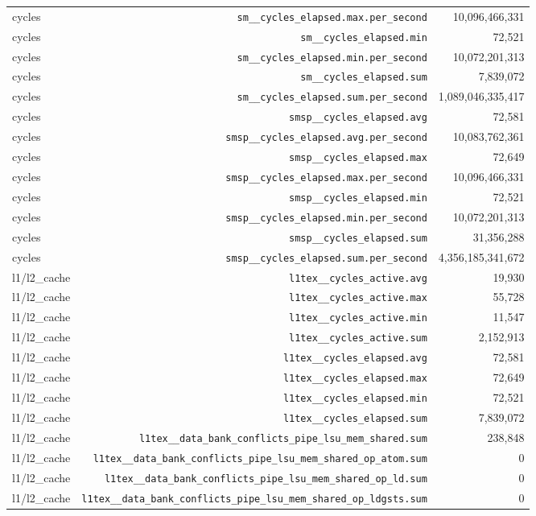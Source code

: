 \begin{table}[h]
\begin{tabular}{|l|r|r|}
cycles & \texttt{sm__cycles_elapsed.max.per_second} & 10,096,466,331 \\
cycles & \texttt{sm__cycles_elapsed.min} & 72,521 \\
cycles & \texttt{sm__cycles_elapsed.min.per_second} & 10,072,201,313 \\
cycles & \texttt{sm__cycles_elapsed.sum} & 7,839,072 \\
cycles & \texttt{sm__cycles_elapsed.sum.per_second} & 1,089,046,335,417 \\
cycles & \texttt{smsp__cycles_elapsed.avg} & 72,581 \\
cycles & \texttt{smsp__cycles_elapsed.avg.per_second} & 10,083,762,361 \\
cycles & \texttt{smsp__cycles_elapsed.max} & 72,649 \\
cycles & \texttt{smsp__cycles_elapsed.max.per_second} & 10,096,466,331 \\
cycles & \texttt{smsp__cycles_elapsed.min} & 72,521 \\
cycles & \texttt{smsp__cycles_elapsed.min.per_second} & 10,072,201,313 \\
cycles & \texttt{smsp__cycles_elapsed.sum} & 31,356,288 \\
cycles & \texttt{smsp__cycles_elapsed.sum.per_second} & 4,356,185,341,672 \\
\hline
l1/l2_cache & \texttt{l1tex__cycles_active.avg} & 19,930 \\
l1/l2_cache & \texttt{l1tex__cycles_active.max} & 55,728 \\
l1/l2_cache & \texttt{l1tex__cycles_active.min} & 11,547 \\
l1/l2_cache & \texttt{l1tex__cycles_active.sum} & 2,152,913 \\
l1/l2_cache & \texttt{l1tex__cycles_elapsed.avg} & 72,581 \\
l1/l2_cache & \texttt{l1tex__cycles_elapsed.max} & 72,649 \\
l1/l2_cache & \texttt{l1tex__cycles_elapsed.min} & 72,521 \\
l1/l2_cache & \texttt{l1tex__cycles_elapsed.sum} & 7,839,072 \\
l1/l2_cache & \texttt{l1tex__data_bank_conflicts_pipe_lsu_mem_shared.sum} & 238,848 \\
l1/l2_cache & \texttt{l1tex__data_bank_conflicts_pipe_lsu_mem_shared_op_atom.sum} & 0 \\
l1/l2_cache & \texttt{l1tex__data_bank_conflicts_pipe_lsu_mem_shared_op_ld.sum} & 0 \\
l1/l2_cache & \texttt{l1tex__data_bank_conflicts_pipe_lsu_mem_shared_op_ldgsts.sum} & 0 \\

\end{tabular}
\end{table}
